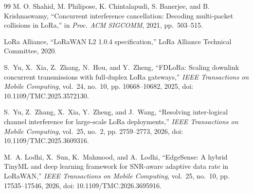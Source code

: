 \documentclass[journal]{IEEEtran}
\begin{document}
\begin{thebibliography}{99}
M. O. Shahid, M. Philipose, K. Chintalapudi, S. Banerjee, and B. Krishnaswamy, ``Concurrent interference cancellation: Decoding multi-packet collisions in LoRa,'' in \emph{Proc. ACM SIGCOMM}, 2021, pp.\ 503--515.


LoRa Alliance, ``LoRaWAN L2 1.0.4 specification,'' LoRa Alliance Technical Committee, 2020.


S.~Yu, X.~Xia, Z.~Zhang, N.~Hou, and Y.~Zheng, 
``{FDLoRa}: Scaling downlink concurrent transmissions with full-duplex LoRa gateways,'' 
\emph{IEEE Transactions on Mobile Computing}, vol.~24, no.~10, pp. 10668--10682, 2025, doi: 10.1109/TMC.2025.3572130.

S.~Yu, Z.~Zhang, X.~Xia, Y.~Zheng, and J.~Wang, 
``Resolving inter-logical channel interference for large-scale LoRa deployments,'' 
\emph{IEEE Transactions on Mobile Computing}, vol.~25, no.~2, pp. 2759--2773, 2026, doi: 10.1109/TMC.2025.3609316.

M.~A. Lodhi, X.~Sun, K.~Mahmood, and A.~Lodhi, 
``{EdgeSense}: A hybrid TinyML and deep learning framework for SNR-aware adaptive data rate in LoRaWAN,'' 
\emph{IEEE Transactions on Mobile Computing}, vol.~25, no.~10, pp. 17535--17546, 2026, doi: 10.1109/TMC.2026.3695916.

\end{thebibliography}
\end{document}
